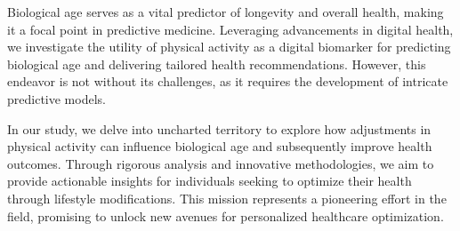 

Biological age serves as a vital predictor of longevity and overall health, making it a focal point in predictive medicine. Leveraging advancements in digital health, we investigate the utility of physical activity as a digital biomarker for predicting biological age and delivering tailored health recommendations. However, this endeavor is not without its challenges, as it requires the development of intricate predictive models.

In our study, we delve into uncharted territory to explore how adjustments in physical activity can influence biological age and subsequently improve health outcomes. Through rigorous analysis and innovative methodologies, we aim to provide actionable insights for individuals seeking to optimize their health through lifestyle modifications. This mission represents a pioneering effort in the field, promising to unlock new avenues for personalized healthcare optimization.
